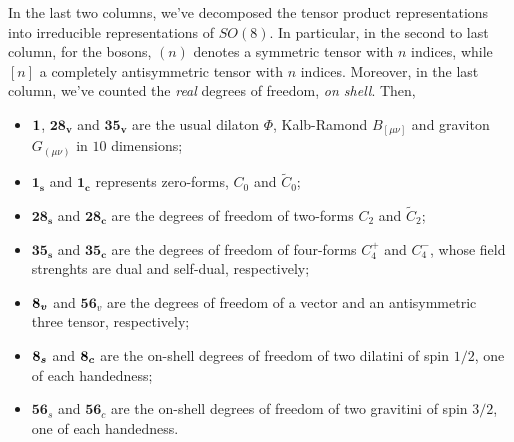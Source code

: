 In the last two columns, we've decomposed the tensor product representations into irreducible representations of $SO(8)$. In particular, in the second to last column, for the bosons, $(n)$ denotes a symmetric tensor with $n$ indices, while $[n]$ a completely antisymmetric tensor with $n$ indices. Moreover, in the last column, we've counted the \emph{real} degrees of freedom, \emph{on shell}. Then,
\begin{itemize}
    \item $\boldsymbol{1}$, $\boldsymbol{28_v}$ and $\boldsymbol{35_v}$ are the usual dilaton $\Phi$, Kalb-Ramond $B_{[\mu\nu]}$ and graviton $G_{(\mu\nu)}$ in $10$ dimensions;
    \item $\boldsymbol{1_s}$ and $\boldsymbol{1_c}$ represents zero-forms, $C_0$ and $\tilde{C}_0$;
    \item $\boldsymbol{28_s}$ and $\boldsymbol{28_c}$ are the degrees of freedom of two-forms $C_2$ and $\tilde{C}_2$;
    \item $\boldsymbol{35_s}$ and $\boldsymbol{35_c}$ are the degrees of freedom of four-forms $C_4^+$ and $C_4^-$, whose field strenghts are dual and self-dual, respectively;
    \item $\boldsymbol{8_v}$ and $\boldsymbol{56}_v$ are the degrees of freedom of a vector and an antisymmetric three tensor, respectively;
    \item $\boldsymbol{8_s}$ and $\boldsymbol{8_c}$ are the on-shell degrees of freedom of two dilatini of spin $1/2$, one of each handedness;
    \item $\boldsymbol{56}_s$ and $\boldsymbol{56}_c$ are the on-shell degrees of freedom of two gravitini of spin $3/2$, one of each handedness.
\end{itemize}

